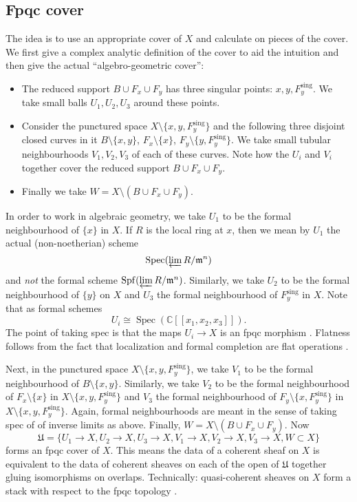 \documentclass{amsart}
\theoremstyle{definition}
\newcommand{\CC} {\mathbb{C}}          %
\newcommand{\Spec}{\operatorname{Spec}}
\newcommand{\sing}{\operatorname{sing}}
\begin{document}
\subsection{Fpqc cover}

The idea is to use an appropriate cover of $X$ and calculate on pieces of the cover. We first give a complex analytic definition of the cover to aid the intuition and then give the actual ``algebro-geometric cover'': 
\begin{itemize}
\item The reduced support $B \cup F_x \cup F_y$ has three singular points: $x,y, F_{y}^{\sing}$. We take small balls $U_1, U_2, U_3$ around these points.
\item Consider the punctured space $X \setminus \{x,y, F_{y}^{\sing}\}$ and the following three disjoint closed curves in it $B \setminus \{x,y\}$, $F_x \setminus \{x\}$, $F_y \setminus \{y,F_{y}^{\sing}\}$. We take small tubular neighbourhoods $V_1, V_2, V_3$ of each of these curves. Note how the $U_i$ and $V_i$ together cover the reduced support  $B \cup F_x \cup F_y$.
\item Finally we take $W = X \setminus (B \cup F_x \cup F_y)$. 
\end{itemize}

In order to work in algebraic geometry, we take $U_1$ to be the formal neighbourhood of $\{x\}$ in $X$. If $R$ is the local ring at $x$, then we mean by $U_1$ the actual (non-noetherian) scheme
$$
\Spec( \varprojlim R / \mathfrak{m}^n )
$$
and \emph{not} the formal scheme $\mathrm{Spf} (\varprojlim R / \mathfrak{m}^n)$. Similarly, we take $U_2$ to be the formal neighbourhood of $\{y\}$ on $X$ and $U_3$ the formal neighbourhood of $F_{y}^{\sing}$ in $X$. Note that as formal schemes
$$
U_i \cong\Spec( \CC[\![x_1,x_2,x_3]\!]).
$$
The point of taking spec is that the maps $U_i \rightarrow X$ is an fpqc morphism \cite{Vis}. Flatness follows from the fact that localization and formal completion are flat operations \cite[Cor.~3.6, Prop.~10.12, Prop.~10.13]{AM}. 

Next, in the punctured space $X \setminus \{x,y,F_{y}^{\sing}\}$, we take $V_1$ to be the formal neighbourhood of $B \setminus \{x,y\}$. Similarly, we take $V_2$ to be the formal neighbourhood of $F_x \setminus \{x\}$ in $X \setminus \{x,y,F_{y}^{\sing}\}$ and $V_3$ the formal neighbourhood of $F_y \setminus \{x, F_{y}^{\sing}\}$ in $X \setminus \{x,y,F_{y}^{\sing}\}$. Again, formal neighbourhoods are meant in the sense of taking spec of of inverse limits as above. Finally, $W = X \setminus (B \cup F_x \cup F_y)$. Now
$$
\mathfrak{U} = \{U_1 \rightarrow X, U_2 \rightarrow X, U_3 \rightarrow X, V_1 \rightarrow X, V_2 \rightarrow X, V_3 \rightarrow X, W \subset X\}
$$
forms an fpqc cover of $X$. This means the data of a coherent sheaf on $X$ is equivalent to the data of coherent sheaves on each of the open of $\mathfrak{U}$ together gluing isomorphisms on overlaps. Technically: quasi-coherent sheaves on $X$ form a stack with respect to the fpqc topology \cite[Thm.~4.23]{Vis}.
\end{document}
